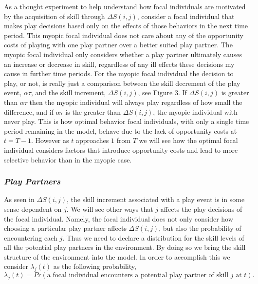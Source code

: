 \documentclass[12pt, letterpaper, fleqn]{article}
\begin{document}
      As a thought experiment to help understand how focal individuals are motivated by the acquisition of skill through $\Delta S(i,j)$, consider a focal individual that makes play decisions based only on the effects of those behaviors in the next time period.
      This myopic focal individual does not care about any of the opportunity costs of playing with one play partner over a better suited play partner. 
      The myopic focal individual only considers whether a play partner ultimately causes an increase or decrease in skill, regardless of any ill effects these decisions my cause in further time periods. 
      For the myopic focal individual the decision to play, or not, is really just a comparison between the skill decrement of the play event, $\alpha \tau$, and the skill increment, $\Delta S(i,j)$, see Figure 3.
      If $\Delta S(i,j)$ is greater than $\alpha \tau$ then the myopic individual will always play regardless of how small the difference, and if $\alpha \tau$ is the greater than $\Delta S(i,j)$, the myopic individual with never play.   
      This is how optimal behavior focal individuals, with only a single time period remaining in the model, behave due to the lack of opportunity costs at $t=T-1$. %
      However as $t$ approaches $1$ from $T$ we will see how the optimal focal individual considers factors that introduce opportunity costs and lead to more selective behavior than in the myopic case.   
          
    \subsubsection*{\it Play Partners}
      As seen in $\Delta S(i,j)$, the skill increment associated with a play event is in some sense dependent on $j$. 
      We will see other ways that $j$ affects the play decisions of the focal individual. 
      Namely, the focal individual does not only consider how choosing a particular play partner affects $\Delta S(i,j)$, but also the probability of encountering each $j$. %
      Thus we need to declare a distribution for the skill levels of all the potential play partners in the environment.
      By doing so we bring the skill structure of the environment into the model.
      In order to accomplish this we consider $\lambda_j(t)$ as the following probability,  %
      \begin{equation}
      \lambda_j(t)=Pr(\text{a focal individual encounters a potential play partner of skill }j\text{ at }t).
      \end{equation} 
      
\end{document}
